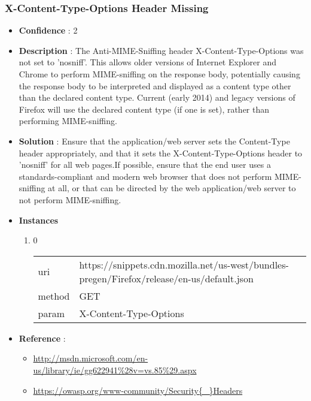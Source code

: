 \documentclass[10pt]{article}
\begin{document}
\subsubsection{X-Content-Type-Options Header Missing}
\begin{itemize}
\item[] \textbf{Confidence} : 2
\item[] \textbf{Description} : The Anti-MIME-Sniffing header X-Content-Type-Options was not set to 'nosniff'. This allows older versions of Internet Explorer and Chrome to perform MIME-sniffing on the response body, potentially causing the response body to be interpreted and displayed as a content type other than the declared content type. Current (early 2014) and legacy versions of Firefox will use the declared content type (if one is set), rather than performing MIME-sniffing.
\item[] \textbf{Solution} :  Ensure that the application/web server sets the Content-Type header appropriately, and that it sets the X-Content-Type-Options header to 'nosniff' for all web pages.If possible, ensure that the end user uses a standards-compliant and modern web browser that does not perform MIME-sniffing at all, or that can be directed by the web application/web server to not perform MIME-sniffing.
\item[] \textbf{Instances}
\begin{enumerate}
\item[] 0
\begin{tabular}{| l | p{14cm}}
uri & https://snippets.cdn.mozilla.net/us-west/bundles-pregen/Firefox/release/en-us/default.json \\
method & GET \\
param & X-Content-Type-Options \\
\end{tabular}
\end{enumerate}
\item[] \textbf{Reference} : 
\begin{itemize}
\item \url{http://msdn.microsoft.com/en-us/library/ie/gg622941\%28v=vs.85\%29.aspx}
\item \url{https://owasp.org/www-community/Security{\_}Headers}
\end{itemize}
\end{itemize}
\end{document}
